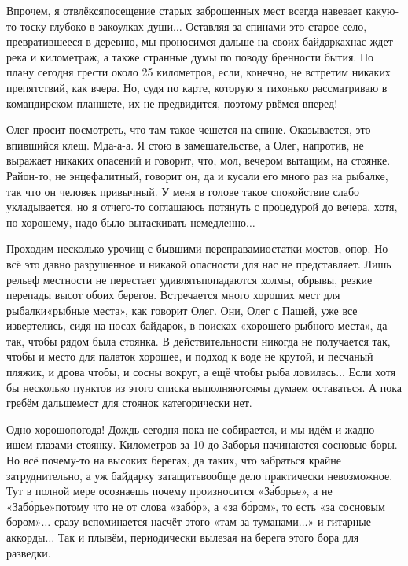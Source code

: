 Впрочем, я отвлёкся\mdash посещение старых заброшенных мест всегда навевает какую-то тоску глубоко в закоулках души$\ldots$ Оставляя за спинами это старое село, превратившееся в деревню, мы проносимся дальше на своих байдарках\mdash нас ждет река и километраж, а также странные думы по поводу бренности бытия. По плану сегодня грести около 25 километров, если, конечно, не встретим никаких препятствий, как вчера. Но, судя по карте, которую я тихонько рассматриваю в командирском планшете, их не предвидится, поэтому рвёмся вперед!

Олег просит посмотреть, что там такое чешется на спине. Оказывается, это впившийся клещ. Мда-а-а. Я стою в замешательстве, а Олег, напротив, не выражает никаких опасений и говорит, что, мол, вечером вытащим, на стоянке. Район-то, не энцефалитный, говорит он, да и кусали его много раз на рыбалке, так что он человек привычный. У меня в голове такое спокойствие слабо укладывается, но я отчего-то соглашаюсь потянуть с процедурой до вечера, хотя, по-хорошему, надо было вытаскивать немедленно$\ldots$

Проходим несколько урочищ с бывшими переправами\mdash остатки мостов, опор. Но всё это давно разрушенное и никакой опасности для нас не представляет. Лишь рельеф местности не перестает удивлять\mdash попадаются холмы, обрывы, резкие перепады высот обоих берегов. Встречается много хороших мест для рыбалки\mdash «рыбные места», как говорит Олег. Они, Олег с Пашей, уже все извертелись, сидя на носах байдарок, в поисках «хорошего рыбного места», да так, чтобы рядом была стоянка. В действительности никогда не получается так, чтобы и место для палаток хорошее, и подход к воде не крутой, и песчаный пляжик, и дрова чтобы, и сосны вокруг, а ещё чтобы рыба ловилась$\ldots$ Если хотя бы несколько пунктов из этого списка выполняются\mdash мы думаем оставаться. А пока гребём дальше\mdash мест для стоянок категорически нет.

Одно хорошо\mdash погода! Дождь сегодня пока не собирается, и мы идём и жадно ищем глазами  стоянку. Километров за 10 до Заборья начинаются сосновые боры. Но всё почему-то на высоких берегах, да таких, что забраться крайне затруднительно, а уж байдарку затащить\mdash вообще дело практически невозможное. Тут в полной мере осознаешь почему произносится «З\'{а}борье», а не «Заб\'{о}рье»\mdash потому что не от слова «заб\'{о}р», а «за б\'{о}ром», то есть «за сосновым бором»$\ldots$ сразу вспоминается насчёт этого «там за туманами$\ldots$» и гитарные аккорды$\ldots$ Так и плывём, периодически вылезая на берега этого бора для разведки.

